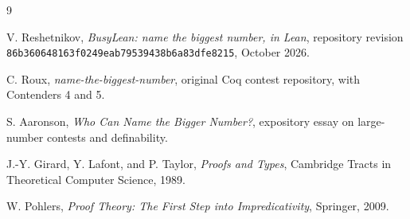 \documentclass[11pt]{article}
\theoremstyle{definition}
\theoremstyle{remark}
\begin{document}
\begin{thebibliography}{9}

V. Reshetnikov,
\emph{BusyLean: name the biggest number, in Lean},
repository revision
\texttt{86b360648163f0249eab79539438b6a83dfe8215}, October 2026.

C. Roux,
\emph{name-the-biggest-number},
original Coq contest repository, with Contenders 4 and 5.

S. Aaronson,
\emph{Who Can Name the Bigger Number?},
expository essay on large-number contests and definability.

J.-Y. Girard, Y. Lafont, and P. Taylor,
\emph{Proofs and Types},
Cambridge Tracts in Theoretical Computer Science, 1989.

W. Pohlers,
\emph{Proof Theory: The First Step into Impredicativity},
Springer, 2009.

\end{thebibliography}
\end{document}
